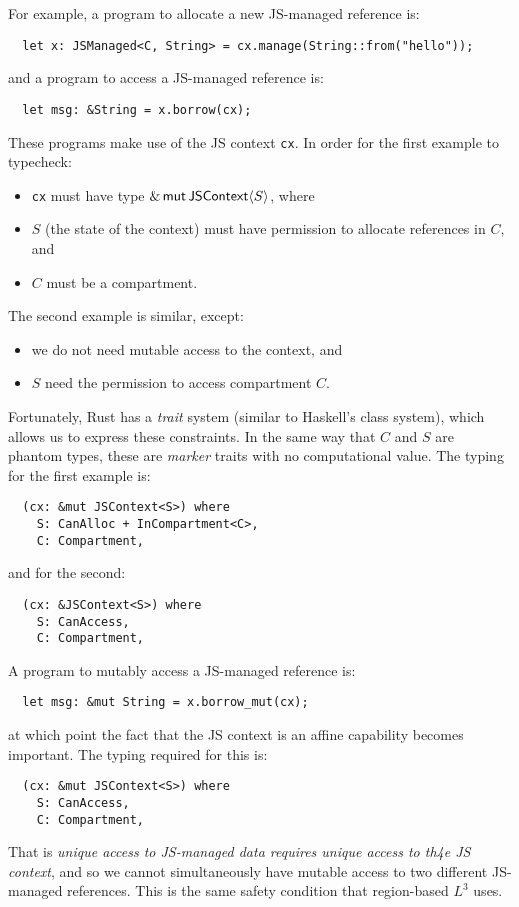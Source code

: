 For example, a program to allocate a new JS-managed reference is:
\begin{verbatim}
  let x: JSManaged<C, String> = cx.manage(String::from("hello"));
\end{verbatim}
and a program to access a JS-managed reference is:
\begin{verbatim}
  let msg: &String = x.borrow(cx);
\end{verbatim}
These programs make use of the JS context \verb|cx|. In order for the
first example to typecheck:
\begin{itemize}

\item \verb|cx| must have type $\&\,\mathsf{mut}\,\mathsf{JSContext}\langle S\rangle$, where
\item $S$ (the state of the context) must have permission to allocate
  references in $C$, and
\item $C$ must be a compartment.

\end{itemize}
The second example is similar, except:
\begin{itemize}

\item we do not need mutable access to the context, and
\item $S$ need the permission to access compartment $C$.

\end{itemize}
Fortunately, Rust has a \emph{trait} system (similar to Haskell's
class system), which allows us to express these constraints.  In the
same way that $C$ and $S$ are phantom types, these are \emph{marker}
traits with no computational value. The typing for
the first example is:
\begin{verbatim}
  (cx: &mut JSContext<S>) where
    S: CanAlloc + InCompartment<C>,
    C: Compartment,
\end{verbatim}
and for the second:
\begin{verbatim}
  (cx: &JSContext<S>) where
    S: CanAccess,
    C: Compartment,
\end{verbatim}
A program to mutably access a JS-managed reference is:
\begin{verbatim}
  let msg: &mut String = x.borrow_mut(cx);
\end{verbatim}
at which point the fact that the JS context is an affine capability
becomes important. The typing required for this is:
\begin{verbatim}
  (cx: &mut JSContext<S>) where
    S: CanAccess,
    C: Compartment,
\end{verbatim}
That is \emph{unique access to JS-managed data requires unique access to th4e JS context},
and so we cannot simultaneously have mutable access to two different JS-managed
references. This is the same safety condition that region-based $L^3$ uses.

